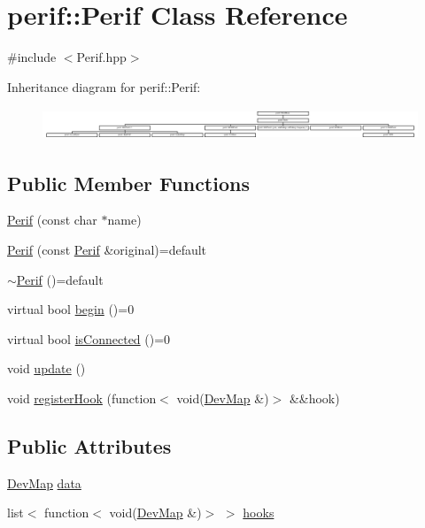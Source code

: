 \hypertarget{classperif_1_1Perif}{}\section{perif\+::Perif Class Reference}
\label{classperif_1_1Perif}


{\ttfamily \#include $<$Perif.\+hpp$>$}

Inheritance diagram for perif\+::Perif\+:\begin{figure}[H]
\begin{center}
\leavevmode
\includegraphics[height=0.958084cm]{classperif_1_1Perif}
\end{center}
\end{figure}
\subsection*{Public Member Functions}
\begin{DoxyCompactItemize}
\item 
\mbox{\hyperlink{classperif_1_1Perif_a8e0c30d9aeb9069e3c1a1aa2db672b62}{Perif}} (const char $\ast$name)
\item 
\mbox{\hyperlink{classperif_1_1Perif_a21a0ae2afadf66cffa487b4a033598d4}{Perif}} (const \mbox{\hyperlink{classperif_1_1Perif}{Perif}} \&original)=default
\item 
\mbox{\hyperlink{classperif_1_1Perif_a9b09771466ddb178c694eec670089fe1}{$\sim$\+Perif}} ()=default
\item 
virtual bool \mbox{\hyperlink{classperif_1_1Perif_ae7f1d1a4e9cd2343d51abc4ee21000cf}{begin}} ()=0
\item 
virtual bool \mbox{\hyperlink{classperif_1_1Perif_ab9a17fad04e595f3ac0c78b9d3be4c9e}{is\+Connected}} ()=0
\item 
void \mbox{\hyperlink{classperif_1_1Perif_ad6fe1a13354bba4af4cc2751399ed93c}{update}} ()
\item 
void \mbox{\hyperlink{classperif_1_1PerifBase_a2e8bcc221ee253b21b61c7c07307d931}{register\+Hook}} (function$<$ void(\mbox{\hyperlink{Perif_8hpp_a358ff4ee6d24694ee7661f0cce14377e}{Dev\+Map}} \&)$>$ \&\&hook)
\end{DoxyCompactItemize}
\subsection*{Public Attributes}
\begin{DoxyCompactItemize}
\item 
\mbox{\hyperlink{Perif_8hpp_a358ff4ee6d24694ee7661f0cce14377e}{Dev\+Map}} \mbox{\hyperlink{classperif_1_1PerifBase_a1a3afaa535fda17e9f97123fffe78765}{data}}
\item 
list$<$ function$<$ void(\mbox{\hyperlink{Perif_8hpp_a358ff4ee6d24694ee7661f0cce14377e}{Dev\+Map}} \&)$>$ $>$ \mbox{\hyperlink{classperif_1_1PerifBase_a98964e5ca8384df64881265e0aa6d7b6}{hooks}}
\end{DoxyCompactItemize}
